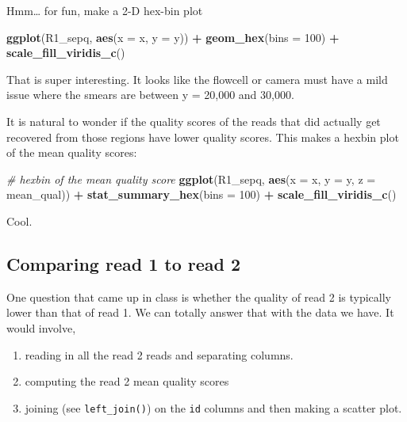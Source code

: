 \documentclass[]{krantz}
\makeatletter
\newenvironment{Shaded}{\begin{snugshade}}{\end{snugshade}}
\newcommand{\CommentTok}[1]{\textcolor[rgb]{0.37,0.37,0.37}{\textit{#1}}}
\newcommand{\DataTypeTok}[1]{\textcolor[rgb]{0.27,0.27,0.27}{#1}}
\newcommand{\DecValTok}[1]{\textcolor[rgb]{0.06,0.06,0.06}{#1}}
\newcommand{\KeywordTok}[1]{\textcolor[rgb]{0.27,0.27,0.27}{\textbf{#1}}}
\newcommand{\NormalTok}[1]{#1}
\newcommand{\OperatorTok}[1]{\textcolor[rgb]{0.43,0.43,0.43}{\textbf{#1}}}
\newcommand{\StringTok}[1]{\textcolor[rgb]{0.5,0.5,0.5}{#1}}
\providecommand{\tightlist}{%
  \setlength{\itemsep}{0pt}\setlength{\parskip}{0pt}}
\newenvironment{kframe}{%
\medskip{}
\setlength{\fboxsep}{.8em}
 \def\at@end@of@kframe{}%
 \ifinner\ifhmode%
  \def\at@end@of@kframe{\end{minipage}}%
  \begin{minipage}{\columnwidth}%
 \fi\fi%
 \def\FrameCommand##1{\hskip\@totalleftmargin \hskip-\fboxsep
 \colorbox{shadecolor}{##1}\hskip-\fboxsep
     \hskip-\linewidth \hskip-\@totalleftmargin \hskip\columnwidth}%
 \MakeFramed {\advance\hsize-\width
   \@totalleftmargin\z@ \linewidth\hsize
   \@setminipage}}%
 {\par\unskip\endMakeFramed%
 \at@end@of@kframe}
\renewenvironment{Shaded}{\begin{kframe}}{\end{kframe}}
\makeatother
\begin{document}
Hmm\ldots{} for fun, make a 2-D hex-bin plot

\begin{Shaded}
\begin{Highlighting}[]
\KeywordTok{ggplot}\NormalTok{(R1_sepq, }\KeywordTok{aes}\NormalTok{(}\DataTypeTok{x =}\NormalTok{ x, }\DataTypeTok{y =}\NormalTok{ y)) }\OperatorTok{+}
\StringTok{  }\KeywordTok{geom_hex}\NormalTok{(}\DataTypeTok{bins =} \DecValTok{100}\NormalTok{) }\OperatorTok{+}
\StringTok{  }\KeywordTok{scale_fill_viridis_c}\NormalTok{()}
\end{Highlighting}
\end{Shaded}

That is super interesting. It looks like the flowcell or camera must have a mild
issue where the smears are between y = 20,000 and 30,000.

It is natural to wonder if the quality scores of the reads that did actually get
recovered from those regions have lower quality scores. This makes a hexbin plot
of the mean quality scores:

\begin{Shaded}
\begin{Highlighting}[]
\CommentTok{# hexbin of the mean quality score}
\KeywordTok{ggplot}\NormalTok{(R1_sepq, }\KeywordTok{aes}\NormalTok{(}\DataTypeTok{x =}\NormalTok{ x, }\DataTypeTok{y =}\NormalTok{ y, }\DataTypeTok{z =}\NormalTok{ mean_qual)) }\OperatorTok{+}
\StringTok{  }\KeywordTok{stat_summary_hex}\NormalTok{(}\DataTypeTok{bins =} \DecValTok{100}\NormalTok{) }\OperatorTok{+}
\StringTok{  }\KeywordTok{scale_fill_viridis_c}\NormalTok{()}
\end{Highlighting}
\end{Shaded}

Cool.

\hypertarget{comparing-read-1-to-read-2}{%
\subsection{Comparing read 1 to read 2}\label{comparing-read-1-to-read-2}}

One question that came up in class is whether the quality of read 2 is typically lower
than that of read 1. We can totally answer that with the data we have. It would involve,

\begin{enumerate}
\def\labelenumi{\arabic{enumi}.}
\tightlist
\item
  reading in all the read 2 reads and separating columns.
\item
  computing the read 2 mean quality scores
\item
  joining (see \texttt{left\_join()}) on the \texttt{id} columns and then making a scatter plot.
\end{enumerate}
\end{document}
